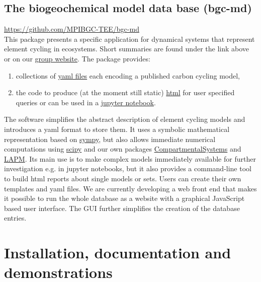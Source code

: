 \documentclass[a4paper]{article}
\begin{document}
\subsection{The biogeochemical model data base (bgc-md)}
\url{https://github.com/MPIBGC-TEE/bgc-md}\\
This package presents a specific application for dynamical systems that represent element cycling in ecosystems.
Short summaries are found under the link above or on our \href{https://www.bgc-jena.mpg.de/TEE/software/bgc-md/}{group website}.
The package provides: 
\begin{enumerate} 
	\item
	collections of \href{https://github.com/MPIBGC-TEE/bgc-md/tree/master/bgc_md/data/all_records}{yaml files} each encoding a published carbon cycling model,
	
	\item 
		the code to produce (at the moment still static) 
		\href{https://www.bgc-jena.mpg.de/TEE/software/bgc-md/vegetation/list_report_v.html}{html} 
		for user specified queries or can be used in a 
		\href{https://github.com/MPIBGC-TEE/bgc-md/blob/master/jupyter_notebooks/Examples/how_to_apply_toolkit_to_yaml_model.ipynb}{jupyter notebook}. 
\end{enumerate} 
The software simplifies the abstract description of element cycling models and introduces a yaml format to store them. 
It uses a symbolic mathematical representation based on \href{http://www.sympy.org/en/index.htmlhttp://www.sympy.org/en/index.html}{sympy}, 
but also allows immediate numerical computations using \href{https://scipy.org/}{scipy} 
and our own packages \href{https://github.com/MPIBGC-TEE/CompartmentalSystems}{CompartmentalSystems} and \href{https://github.com/MPIBGC-TEE/LAPM}{LAPM}. 
Its main use is to make complex models immediately available for further investigation e.g. in jupyter notebooks, but it also provides a command-line tool to build html reports about single models or sets. Users can create their own templates and yaml files.
We are currently developing a web front end that makes it possible to run the whole database as a website 
with a graphical JavaScript based user interface. 
The GUI further simplifies the creation of the database entries. 



\section{Installation, documentation and demonstrations}
\end{document}
